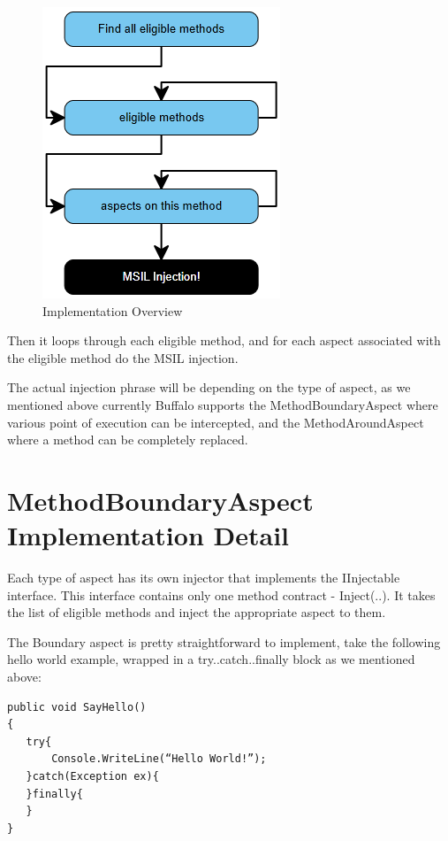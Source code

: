 \begin{figure}[H]
  \includegraphics[scale=1.0]{ImplementationOverview3.PNG}
  \centering
  \caption{Implementation Overview\label{implementation_overview}}
\end{figure}

Then it loops through each eligible method, and for each aspect associated with the eligible method do the MSIL injection.

The actual injection phrase will be depending on the type of aspect, as we mentioned above currently Buffalo supports the MethodBoundaryAspect where various point of execution can be intercepted, and the MethodAroundAspect where a method can be completely replaced.

\section{MethodBoundaryAspect Implementation Detail}

Each type of aspect has its own injector that implements the IInjectable interface. This interface contains only one method contract - Inject(..). It takes the list of eligible methods and inject the appropriate aspect to them.

The Boundary aspect is pretty straightforward to implement, take the following hello world example, wrapped in a try..catch..finally block as we mentioned above:

\begin{lstlisting}[caption={SayHello function}, label=sayhello]
public void SayHello()
{
   try{
       Console.WriteLine(“Hello World!”);
   }catch(Exception ex){
   }finally{
   }
}
\end{lstlisting}

